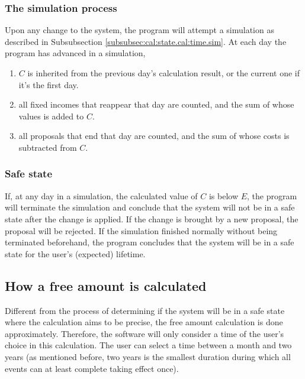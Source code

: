 \subsubsection{The simulation process}
Upon any change to the system, the program will attempt a simulation as described in Subsubsection \ref{subsubsec:cal:state.cal:time.sim}. At each day the program has advanced in a simulation,
\begin{enumerate}
	\item $C$ is inherited from the previous day's calculation result, or the current one if it's the first day.
	\item all fixed incomes that reappear that day are counted, and the sum of whose values is added to $C$.
	\item all proposals that end that day are counted, and the sum of whose costs is subtracted from $C$.
\end{enumerate}

\subsubsection{Safe state}
If, at any day in a simulation, the calculated value of $C$ is below $E$, the program will terminate the simulation and conclude that the system will not be in a safe state after the change is applied. If the change is brought by a new proposal, the proposal will be rejected. If the simulation finished normally without being terminated beforehand, the program concludes that the system will be in a safe state for the user's (expected) lifetime.

\subsection{How a free amount is calculated}
Different from the process of determining if the system will be in a safe state where the calculation aims to be precise, the free amount calculation is done approximately. Therefore, the software will only consider a time of the user's choice in this calculation. The user can select a time between a month and two years (as mentioned before, two years is the smallest duration during which all events can at least complete taking effect once).

